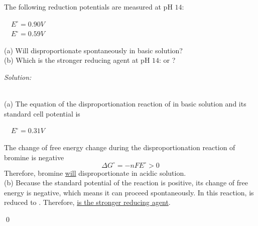 \documentclass[12pt]{article}
\newenvironment{problem}[2][Problem]{\begin{trivlist}
\item[\hskip \labelsep {\bfseries #1}\hskip \labelsep {\bfseries #2.}]}{\end{trivlist}}
\newenvironment{sol}
    {\emph{Solution:}
    }
    {
    \qed
    }
\begin{document}
\begin{problem}{17.26}
The following reduction potentials are measured at pH $14$:
\begin{center}
~~$E^{\circ}=0.90V$\\
~~$E^{\circ}=0.59V$
\end{center}
(a) Will  disproportionate spontaneously in basic solution?\\
(b) Which is the stronger reducing agent at pH $14$:  or ?
\end{problem}
\begin{sol}
\\(a) The equation of the disproportionation reaction of  in basic solution and its standard cell potential is
\begin{center}
~~$E^{\circ}=0.31V$
\end{center}
The change of free energy change during the disproportionation reaction of bromine is negative
\[
\Delta G^{\circ}=-nFE^{\circ}>0
\]
Therefore, bromine \uline{will} disproportionate in acidic solution.\\
(b) Because the standard potential of the reaction  is positive, its change of free energy is negative, which means it can proceed spontaneously. In this reaction,  is reduced to . Therefore, \uline{ is the stronger reducing agent}.
\end{sol}
\end{document}
